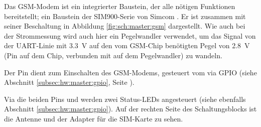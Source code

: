 Das GSM-Modem  ist ein  integrierter Baustein,  der alle  n\"otigen Funktionen
bereitstellt; ein Baustein der SIM900-Serie von Simcom \cite{datasheet:modem}.
Er ist  zusammen mit seiner Beschaltung  in Abbildung \ref{fig:sch:master:gsm}
dargestellt. Wie auch  bei der  Strommessung wird  auch hier  ein Pegelwandler
verwendet, um  das Signal von der  UART-Linie mit \SI{3.3}{\volt} auf  den vom
GSM-Chip ben\"otigten  Pegel von \SI{2.8}{\volt} (Pin   auf dem
Chip, verbunden mit  auf dem Pegelwandler) zu wandeln.

Der  Pin   dient  zum  Einschalten  des GSM-Modems,  gesteuert
vom  \Raspi  via  GPIO  (siehe  Abschnitt  \ref{subsec:hw:master:gpio},  Seite
\pageref{subsec:hw:master:gpio}).

Via die beiden Pins   und  werden zwei Status-LEDs
angesteuert (siehe  ebenfalls Abschnitt  \ref{subsec:hw:master:gpio}). Auf der
rechten Seite des  Schaltungsblocks ist die Antenne und der  Adapter f\"ur die
SIM-Karte zu sehen.

